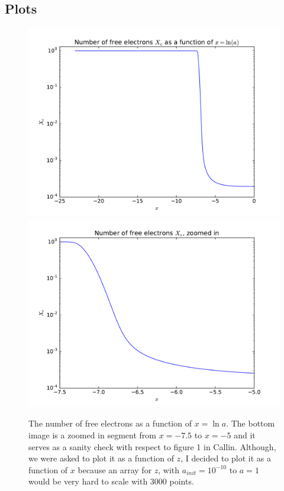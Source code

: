 \documentclass[12pt]{article}
\begin{document}
\subsection*{Plots}
\begin{figure}[H]
\centering
\includegraphics[width=0.75\linewidth]{Plots/ElectronNumber.pdf}
\includegraphics[width=0.75\linewidth]{Plots/ElectronNumberZoomed.pdf}
\caption{The number of free electrons as a function of $x=\ln a$. The bottom image is a zoomed in segment from $x=-7.5$ to $x=-5$ and it serves as a sanity check with respect to figure 1 in Callin. Although, we were asked to plot it as a function of $z$, I decided to plot it as a function of $x$ because an array for $z$, with $a_{init}=10^{-10}$ to $a=1$ would be very hard to scale with 3000 points.}
\end{figure}
\end{document}
